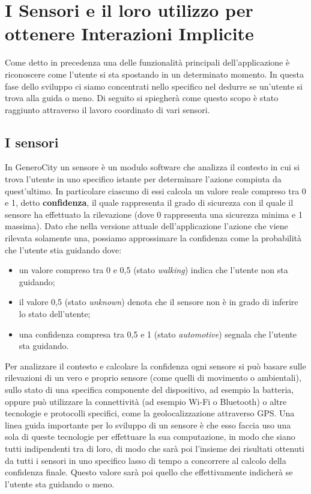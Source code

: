 \chapter{I Sensori e il loro utilizzo per ottenere Interazioni Implicite}
Come detto in precedenza una delle funzionalità principali dell'applicazione è riconoscere come l'utente si sta spostando in un determinato momento. In questa fase dello sviluppo ci siamo concentrati nello specifico nel dedurre se un'utente si trova alla guida o meno. Di seguito si spiegherà come questo scopo è stato raggiunto attraverso il lavoro coordinato di vari sensori.
\section{I sensori}
In GeneroCity un sensore è un modulo software che analizza il contesto in cui si trova l'utente in uno specifico istante per determinare l'azione compiuta da quest'ultimo. In particolare ciascuno di essi calcola un valore reale compreso tra 0 e 1, detto \textbf{confidenza}, il quale rappresenta il grado di sicurezza con il quale il sensore ha effettuato la rilevazione (dove 0 rappresenta una sicurezza minima e 1 massima). Dato che nella versione attuale dell'applicazione l'azione che viene rilevata solamente una, possiamo approssimare la confidenza come la probabilità che l'utente stia guidando dove:
\begin{itemize}
    \item un valore compreso tra 0 e 0,5 (stato \textit{walking}) indica che l'utente non sta guidando;
    \item il valore 0,5 (stato \textit{unknown}) denota che il sensore non è in grado di inferire lo stato dell'utente;
    \item una confidenza compresa tra 0,5 e 1 (stato \textit{automotive}) segnala che l'utente sta guidando.
\end{itemize}

Per analizzare il contesto e calcolare la confidenza ogni sensore si può basare sulle rilevazioni di un vero e proprio sensore (come quelli di movimento o ambientali), sullo stato di una specifica componente del dispositivo, ad esempio la batteria, oppure può utilizzare la connettività (ad esempio Wi-Fi o Bluetooth) o altre tecnologie e protocolli specifici, come la geolocalizzazione attraverso GPS. Una linea guida importante per lo sviluppo di un sensore è che esso faccia uso una sola di queste tecnologie per effettuare la sua computazione, in modo che siano tutti indipendenti tra di loro, di modo che sarà poi l'insieme dei risultati ottenuti da tutti i sensori in uno specifico lasso di tempo a concorrere al calcolo della confidenza finale. Questo valore sarà poi quello che effettivamente indicherà se l'utente sta guidando o meno.


